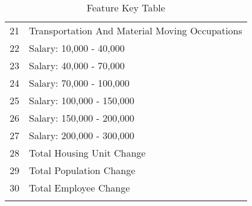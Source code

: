 \documentclass{article}
\begin{document}
\begin{table}[H]
{\begin{tabular}{|c|l|}
    \Xhline{1 pt} 
    21     &  Transportation And Material Moving Occupations\\
    \Xhline{1 pt} 
    22  & Salary: 10,000 - 40,000\\
    \Xhline{1 pt} 
    23  & Salary: 40,000 - 70,000\\
    \Xhline{1 pt} 
    24  & Salary: 70,000 - 100,000\\
    \Xhline{1 pt} 
    25  & Salary: 100,000 - 150,000\\
    \Xhline{1 pt} 
    26  & Salary: 150,000 - 200,000\\
    \Xhline{1 pt} 
    27  & Salary: 200,000 - 300,000\\
    \Xhline{1 pt} 
    28  & Total Housing Unit Change\\
    \Xhline{1 pt} 
    29  & Total Population Change\\
    \Xhline{1 pt} 
    30  & Total Employee Change \\
    \Xhline{1 pt} 
    \end{tabular}}
    \caption{Feature Key Table}
    \label{tab: feature_key}
\end{table}
\end{document}
